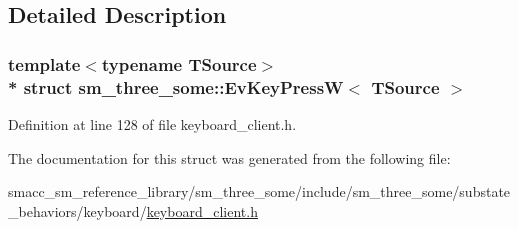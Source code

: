 \subsection{Detailed Description}
\subsubsection*{template$<$typename T\+Source$>$\\*
struct sm\+\_\+three\+\_\+some\+::\+Ev\+Key\+Press\+W$<$ T\+Source $>$}



Definition at line 128 of file keyboard\+\_\+client.\+h.



The documentation for this struct was generated from the following file\+:\begin{DoxyCompactItemize}
\item 
smacc\+\_\+sm\+\_\+reference\+\_\+library/sm\+\_\+three\+\_\+some/include/sm\+\_\+three\+\_\+some/substate\+\_\+behaviors/keyboard/\hyperlink{keyboard__client_8h}{keyboard\+\_\+client.\+h}\end{DoxyCompactItemize}
